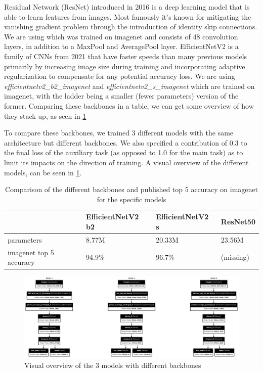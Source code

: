 \documentclass[12pt,a4paper,oneside]{article}
\begin{document}
\smallskip
Residual Network (ResNet) \cite{he2016identity} introduced in 2016 is a deep learning model that is able to learn features from images. Most famously it's known for mitigating the vanishing gradient problem through the introduction of identity skip connections. We are using  which was trained on imagenet and consists of 48 convolution layers, in addition to a MaxPool and AveragePool layer. EfficientNetV2 \cite{tan2021efficientnetv2} is a family of CNNs from 2021 that have faster speeds than many previous models primarily by increasing image size during training and incorporating adaptive regularization to compensate for any potential accuracy loss. We are using \textit{efficientnetv2\_b2\_imagenet} and \textit{efficientnetv2\_s\_imagenet} which are trained on imagenet, with the ladder being a smaller (fewer parameters) version of the former. Comparing these backbones in a table, we can get some overview of how they stack up, as seen in \ref{tab:backbone_comparison}

To compare these backbones, we trained 3 different models with the same architecture but different backbones. We also specified a contribution of 0.3 to the final loss of the auxiliary task (as opposed to 1.0 for the main task) as to limit its impacts on the direction of training. A visual overview of the different models, can be seen in \ref{fig:models_overview}. 


\begin{table}[!h]
    \centering
    \begin{tabular}{@{}llll@{}}
    \toprule
    & EfficientNetV2 b2 & EfficientNetV2 s & ResNet50 \\ \midrule
    parameters              & 8.77M             & 20.33M           & 23.56M   \\
    imagenet top 5 accuracy & 94.9\%            & 96.7\%           & (missing)       \\ \bottomrule
\end{tabular}
\caption{Comparison of the different backbones and published top 5 accuracy on imagenet for the specific models}
\label{tab:backbone_comparison}
\end{table}

\begin{figure}[!h]
    \centering
    \includegraphics[width=1\textwidth]{assets/different_models.png}
    \caption{Visual overview of the 3 models with different backbones}
    \label{fig:models_overview}
\end{figure}
\end{document}
